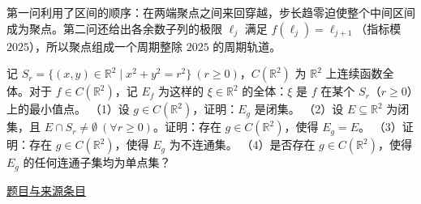 \documentclass[UTF8,12pt,a4paper,fontset=fandol]{ctexart}
\begin{document}
\begin{remark}[方法与条件]第一问利用了区间的顺序：在两端聚点之间来回穿越，步长趋零迫使整个中间区间成为聚点。第二问还给出各余数子列的极限 $\ell_j$ 满足 $f(\ell_j)=\ell_{j+1}$（指标模 $2025$），所以聚点组成一个周期整除 $2025$ 的周期轨道。\end{remark}

\begin{example}\label{ex:fin16-high:8}\label{pr:fin16-high:8}

记 $S_r = \{(x,y) \in \mathbb{R}^2 \mid x^2 + y^2 = r^2\}\ (r \geq 0)$，$C(\mathbb{R}^2)$ 为 $\mathbb{R}^2$ 上连续函数全体。对于 $f \in C(\mathbb{R}^2)$，记 $E_f$ 为这样的 $\xi \in \mathbb{R}^2$ 的全体：$\xi$ 是 $f$ 在某个 $S_r$（$r \geq 0$）上的最小值点。
（1）设 $g \in C(\mathbb{R}^2)$，证明：$E_g$ 是闭集。
（2）设 $E \subseteq \mathbb{R}^2$ 为闭集，且 $E \cap S_r \neq \emptyset\ (\forall r \geq 0)$。证明：存在 $g \in C(\mathbb{R}^2)$，使得 $E_g = E$。
（3）证明：存在 $g \in C(\mathbb{R}^2)$，使得 $E_g$ 为不连通集。
（4）是否存在 $g \in C(\mathbb{R}^2)$，使得 $E_g$ 的任何连通子集均为单点集？

\par\href{https://github.com/lzxcr/cmc-mathematics/blob/64916fa1fdbc3e444a652eca204d5669058ee321/src/problems/finals/16/09.md}{题目与来源条目}

\end{example}
\end{document}
